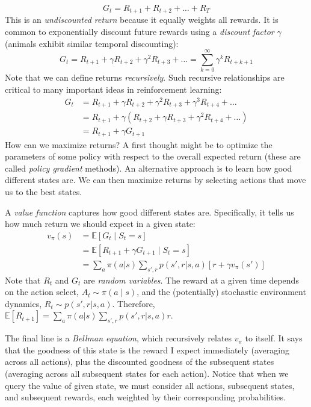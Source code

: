 $$ G_t = R_{t+1} + R_{t+2} + \dots + R_{T}$$
This is an \textit{undiscounted return} because it equally weights all rewards. It is common to exponentially discount future rewards using a \textit{discount factor} $\gamma$ (animals exhibit similar temporal discounting):
$$
G_t = R_{t+1} + \gamma R_{t+2} + \gamma^2R_{t+3} + \dots = 
\sum_{k=0}^\infty \gamma^k R_{t+k+1}
$$
Note that we can define returns \textit{recursively}. Such recursive relationships are critical to many important ideas in reinforcement learning:
\begin{align*}
G_t &= R_{t+1} + \gamma R_{t+2} + \gamma^2R_{t+3} + \gamma^3R_{t+4} + \dots \\
&= R_{t+1} + \gamma(R_{t+2} + \gamma R_{t+3} + \gamma^2R_{t+4} +\dots) \\
&= R_{t+1} + \gamma G_{t+1}
\end{align*}
How can we maximize returns? A first thought might be to optimize the parameters of some policy with respect to the overall expected return (these are called \textit{policy gradient} methods). An alternative approach is to learn how good different states are. We can then maximize returns by selecting actions that move us to the best states.

A \textit{value function} captures how good different states are. Specifically, it tells us how much return we should expect in a given state:
\begin{align*}
v_\pi (s) &= \mathbb{E}[G_t \mid S_t=s] \\
&= \mathbb{E}[R_{t+1} + \gamma G_{t+1} \mid S_t=s] \\
&= \sum_a \pi (a|s) \sum_{s', r} p(s', r | s, a) [r + \gamma v_\pi (s')]
\end{align*}
Note that $R_t$ and $G_t$ are \textit{random variables}. The reward at a given time depends on the action select, $A_t \sim \pi (a \mid s)$, and the (potentially) stochastic environment dynamics, $R_t \sim p(s',r|s,a)$. Therefore, $\mathbb{E}[R_{t+1}] = \sum_a \pi (a|s) \sum_{s', r} p(s', r | s, a)r$.

The final line is a \textit{Bellman equation}, which recursively relates $v_\pi$ to itself. It says that the goodness of this state is the reward I expect immediately (averaging across all actions), plus the discounted goodness of the subsequent states (averaging across all subsequent states for each action). Notice that when we query the value of given state, we must consider all actions, subsequent states, and subsequent rewards, each weighted by their corresponding probabilities.

